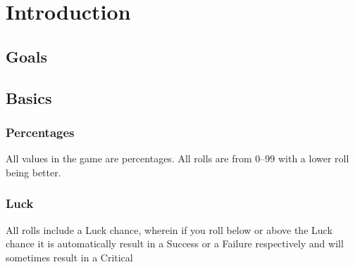 
\chapter{Introduction}

\section{Goals}
\section{Basics}
\subsection{Percentages}
All values in the game are percentages. All rolls are from 0--99 with a lower roll being better.
\subsection{Luck}
All rolls include a \gls{Luck} chance, wherein if you roll below or above the \gls{Luck} chance it is automatically result in a \gls{Success} or a \gls{Failure} respectively and will sometimes result in a \gls{Critical}
